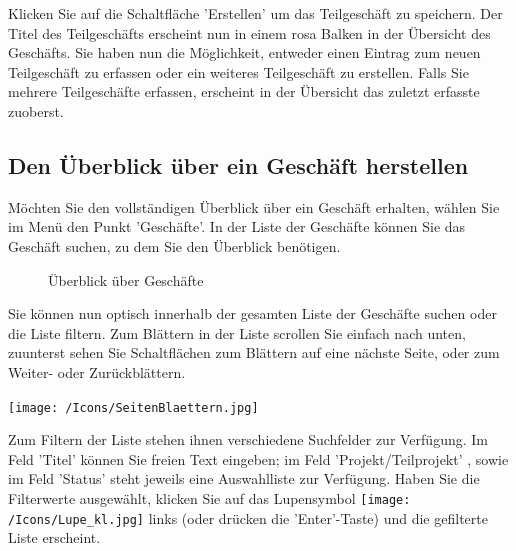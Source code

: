 Klicken Sie auf die Schaltfläche 'Erstellen'  um das Teilgeschäft zu speichern. Der Titel des Teilgeschäfts erscheint nun in einem rosa Balken in der Übersicht des Geschäfts. Sie haben nun die Möglichkeit, entweder einen Eintrag zum neuen Teilgeschäft zu erfassen oder ein weiteres Teilgeschäft zu erstellen. Falls Sie mehrere Teilgeschäfte erfassen, erscheint in der Übersicht das zuletzt erfasste zuoberst.

\subsection{Den Überblick über ein Geschäft herstellen}

Möchten Sie den vollständigen Überblick über ein Geschäft erhalten, wählen Sie im Menü den Punkt 'Geschäfte'. In der Liste der Geschäfte können Sie das Geschäft suchen, zu dem Sie den Überblick benötigen.

\begin{figure}[H]
\caption{Überblick über Geschäfte}
\end{figure}

Sie können nun optisch innerhalb der gesamten Liste der Geschäfte suchen oder die Liste filtern. Zum Blättern in der Liste scrollen Sie einfach nach unten, zuunterst sehen Sie Schaltflächen zum Blättern auf eine nächste Seite, oder zum Weiter- oder Zurückblättern.

\begin{center}
\texttt{[image: /Icons/SeitenBlaettern.jpg]}
\end{center}

Zum Filtern der Liste stehen ihnen verschiedene Suchfelder zur Verfügung. Im Feld 'Titel'  können Sie freien Text eingeben; im Feld 'Projekt/Teilprojekt' , sowie im Feld 'Status'  steht jeweils eine Auswahlliste zur Verfügung. Haben Sie die Filterwerte ausgewählt, klicken Sie auf das Lupensymbol \texttt{[image: /Icons/Lupe\_kl.jpg]}  links (oder drücken die 'Enter'-Taste) und die gefilterte Liste erscheint.

